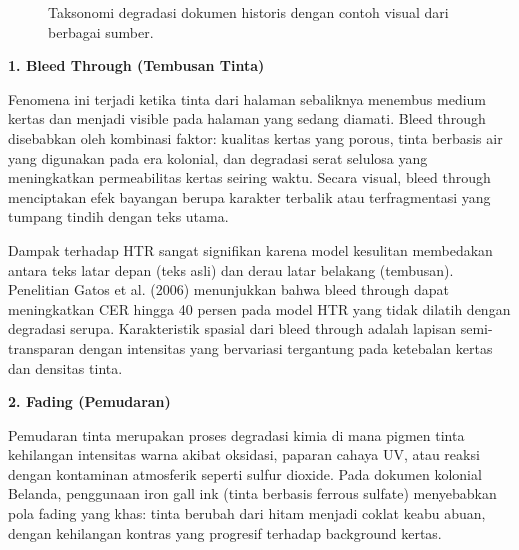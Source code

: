 \documentclass[12pt,a4paper]{article}
\begin{document}
\begin{figure}[H]
\centering
\caption{Taksonomi degradasi dokumen historis dengan contoh visual dari berbagai sumber.}
\label{fig:degradation-types}
\end{figure}

\textbf{1. Bleed Through (Tembusan Tinta)}

Fenomena ini terjadi ketika tinta dari halaman sebaliknya menembus medium kertas dan menjadi visible pada halaman yang sedang diamati. Bleed through disebabkan oleh kombinasi faktor: kualitas kertas yang porous, tinta berbasis air yang digunakan pada era kolonial, dan degradasi serat selulosa yang meningkatkan permeabilitas kertas seiring waktu. Secara visual, bleed through menciptakan efek bayangan berupa karakter terbalik atau terfragmentasi yang tumpang tindih dengan teks utama.

Dampak terhadap HTR sangat signifikan karena model kesulitan membedakan antara teks latar depan (teks asli) dan derau latar belakang (tembusan). Penelitian Gatos et al. (2006) menunjukkan bahwa bleed through dapat meningkatkan CER hingga 40 persen pada model HTR yang tidak dilatih dengan degradasi serupa. Karakteristik spasial dari bleed through adalah lapisan semi-transparan dengan intensitas yang bervariasi tergantung pada ketebalan kertas dan densitas tinta.

\textbf{2. Fading (Pemudaran)}

Pemudaran tinta merupakan proses degradasi kimia di mana pigmen tinta kehilangan intensitas warna akibat oksidasi, paparan cahaya UV, atau reaksi dengan kontaminan atmosferik seperti sulfur dioxide. Pada dokumen kolonial Belanda, penggunaan iron gall ink (tinta berbasis ferrous sulfate) menyebabkan pola fading yang khas: tinta berubah dari hitam menjadi coklat keabu abuan, dengan kehilangan kontras yang progresif terhadap background kertas.
\end{document}

